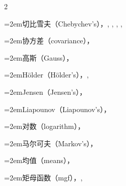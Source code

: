 \begin{multicols}{2}
\par\noindent\hangindent=2em\hspace*{1em}\label{idx:565}切比雪夫（Chebychev’s），\hyperref[thm:3.6.1]{\pageref*{thm:3.6.1}}, \hyperref[thm:3.8.2]{\pageref*{thm:3.8.2}}, \hyperref[thm:5.5.2]{\pageref*{thm:5.5.2}}, \hyperref[sec:5.8.3]{\pageref*{sec:5.8.3}}, \hyperref[idxocc:565:409]{\pageref*{idxocc:565:409}}\par
\par\noindent\hangindent=2em\hspace*{1em}\label{idx:566}协方差（covariance），\hyperref[thm:4.7.9]{\pageref*{thm:4.7.9}}\par
\par\noindent\hangindent=2em\hspace*{1em}\label{idx:567}高斯（Gauss），\hyperref[thm:3.8.4]{\pageref*{thm:3.8.4}}\par
\par\noindent\hangindent=2em\hspace*{1em}\label{idx:568}Hölder（Hölder’s），\hyperref[thm:4.7.2]{\pageref*{thm:4.7.2}}, \hyperref[idxocc:568:471]{\pageref*{idxocc:568:471}}\par
\par\noindent\hangindent=2em\hspace*{1em}\label{idx:569}Jensen（Jensen’s），\hyperref[thm:4.7.7]{\pageref*{thm:4.7.7}}\par
\par\noindent\hangindent=2em\hspace*{1em}\label{idx:570}Liapounov（Liapounov’s），\hyperref[eq:4.7.6]{\pageref*{eq:4.7.6}}\par
\par\noindent\hangindent=2em\hspace*{1em}\label{idx:571}对数（logarithm），\hyperref[exercise:1.28]{\pageref*{exercise:1.28}}\par
\par\noindent\hangindent=2em\hspace*{1em}\label{idx:572}马尔可夫（Markov’s），\hyperref[lem:3.8.3]{\pageref*{lem:3.8.3}}\par
\par\noindent\hangindent=2em\hspace*{1em}\label{idx:573}均值（means），\hyperref[ex:4.7.8]{\pageref*{ex:4.7.8}}\par
\par\noindent\hangindent=2em\hspace*{1em}\label{idx:574}矩母函数（mgf），\hyperref[exercise:3.45]{\pageref*{exercise:3.45}}, \hyperref[exercise:5.38]{\pageref*{exercise:5.38}}\par

\end{multicols}
